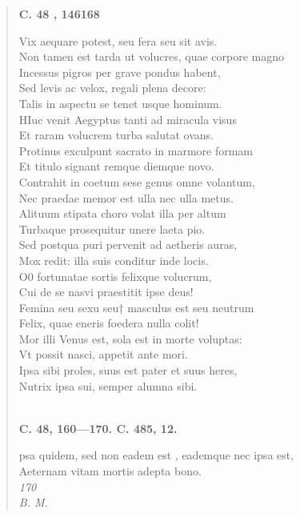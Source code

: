 \documentclass[11pt, a4paper]{report}
\begin{document}
\begin{verse}
    \begin{center} \textbf{C. 48 , 146168} \end{center}Vix aequare potest, seu fera seu sit avis. \\ Non tamen est tarda ut volucres, quae corpore magno \\ Incessus pigros per grave pondus habent, \\ Sed levis ac velox, regali plena decore: \\ Talis in aspectu se tenet usque hominum. \\ HIuc venit Aegyptus tanti ad miracula visus \\ Et raram volucrem turba salutat ovans. \\ Protinus exculpunt sacrato in marmore formam \\ Et titulo signant remque diemque novo. \\ Contrahit in coetum sese genus omne volantum, \\ Nec praedae memor est ulla nec ulla metus. \\ Alituum stipata choro volat illa per altum \\ Turbaque prosequitur unere laeta pio. \\ Sed postqua puri pervenit ad aetheris auras, \\ Mox redit: illa suis conditur inde locis. \\ O0 fortunatae sortis felixque volucrum, \\ Cui de se nasvi praestitit ipse deus! \\ Femina seu  \lbrack sexu seu† masculus est seu neutrum \\ Felix, quae eneris foedera nulla colit! \\ Mor illi Venus est, sola est in morte voluptas: \\ Vt possit nasci, appetit ante mori. \\ Ipsa sibi proles, suus est pater et suus heres, \\ Nutrix ipsa sui, semper alumna sibi. \\ 
        ﻿\pagebreak 
     \marginpar{[28]} \begin{center} \textbf{C. 48, 160—170. C. 485, 12.} \end{center}psa quidem, sed non  \lbrack eadem est \rbrack , eademque nec ipsa est, \\ Aeternam vitam mortis adepta bono. \\ \textit{170} \\ \textit{B. M.} \\ 
      \end{verse}
  
\end{document}
